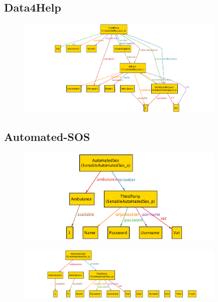 \documentclass[a4paper]{article}
\begin{document}
\subsection{Data4Help}
    
    
    
    \begin{figure}[!htpb]
    	\centering
    	\includegraphics[width=100mm]{images/alloy/makeOneRequest.png}
    \end{figure}
    
    

\subsection{Automated-SOS}
    
    
    
    \begin{figure}[!htpb]
    	\centering
    	\includegraphics[width=100mm]{images/alloy/enableSos.png}
    \end{figure}
    
    
    \begin{figure}[!h]
    	\centering
    	\includegraphics[width=100mm]{images/alloy/runSos.png}
    \end{figure}
\end{document}
